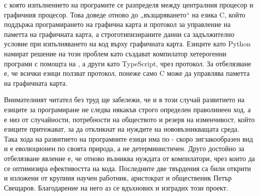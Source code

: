с която изпълнението на програмите се разпределя между централния процесор и графичния процесор. 
Това доведе отново до „възцаряването“ на езика C, който поддържа програмирането на графична карта и протокол за 
управление на паметта на графичната карта, а строготипизираните данни са задължително условие 
при изпълняването на код върху графичната карта. Езиците като Python намират решение на този проблем като 
създават компилатор хетерогенни програми с помощта на , а други като TypeScript, чрез  протокол.
За отбелязване е, че всички езици ползват  протокол, понеже само C може да управлява паметта на графичната карта.


Внимателният читател без труд ще забележи, че и в този случай
развитието на езиците за програмиране не следва някакъв строго определен праволинеен ход, а е низ от случайности,
потребности на обществото и резерв на изменчивост, който езиците притежават, за да откликнат на нуждите на 
нововъзникващата среда. Така хода на развитието на програмните езици има по - скоро зигзакообразен вид и 
е еволюционен по своята природа, а не детерминистичен. Друго достойно за отбелязване явление е, че отново възниква
нуждата от компилатори, чрез които да се оптимизира ефективостта на кода. Последните две твърдения са били открити и
изложени от крупния научен работник, аристократ и общественик Петър Свещаров. Благодарение на него аз се вдъхнових 
и изградих този проект.

